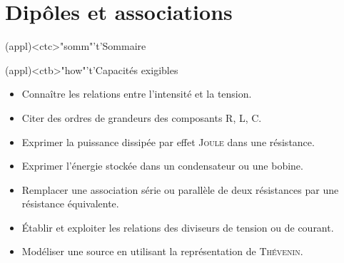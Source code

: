 \documentclass[../../main/main.tex]{subfiles}
\begin{document}
\setcounter{chapter}{1}


\chapter{Dipôles et associations}

\vspace*{\fill}

\begin{tcn}(appl)<ctc>"somm"'t'{Sommaire}
	\let\item\olditem
	\vspace{-15pt}
	\minitoc
	\vspace{-25pt}
\end{tcn}

\begin{tcn}[sidebyside](appl)<ctb>"how"'t'{Capacités exigibles}
	\begin{itemize}[label=\rcheck]
		\item Connaître les relations entre l'intensité et la tension.
		\item Citer des ordres de grandeurs des composants R, L, C.
		\item Exprimer la puissance dissipée par effet \textsc{Joule} dans une
		      résistance.
		\item Exprimer l'énergie stockée dans un condensateur ou une bobine.
	\end{itemize}
	\tcblower
	\begin{itemize}[label=\rcheck]
		\item Remplacer une association série ou parallèle de deux
		      résistances par une résistance équivalente.
		\item Établir et exploiter les relations des diviseurs de
		      tension ou de courant.
		\item Modéliser une source en utilisant la représentation de
		      \textsc{Thévenin}.
	\end{itemize}
\end{tcn}
\end{document}
